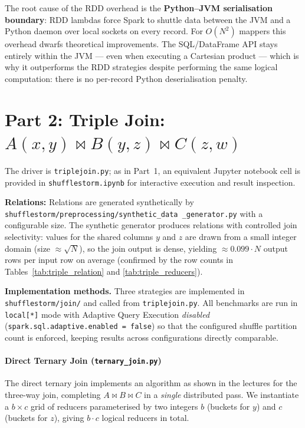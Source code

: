 \documentclass[11pt,a4paper]{article}
\begin{document}
The root cause of the RDD overhead is the \textbf{Python–JVM serialisation boundary}: RDD lambdas force Spark to shuttle data between the JVM and a Python daemon over local sockets on every record. For $O(N^2)$ mappers this overhead dwarfs theoretical improvements. The SQL/DataFrame API stays entirely within the JVM — even when executing a Cartesian product — which is why it outperforms the RDD strategies despite performing the same logical computation: there is no per-record Python deserialisation penalty.

\part*{Part 2: Triple Join: $A(x,y) \bowtie B(y,z) \bowtie C(z,w)$}

The driver is \texttt{triplejoin.py}; as in Part~1, an equivalent Jupyter notebook cell is provided in \texttt{shufflestorm.ipynb} for interactive execution and result inspection.

\textbf{Relations:} Relations are generated synthetically by \texttt{shufflestorm/preprocessing/synthetic\_data \_generator.py} with a configurable size. The synthetic generator produces relations with controlled join selectivity: values for the shared columns $y$ and $z$ are drawn from a small integer domain (size $\approx \sqrt{N}$), so the join output is dense, yielding $\approx 0.099 \cdot N$ output rows per input row on average (confirmed by the row counts in Tables~\ref{tab:triple_relation} and \ref{tab:triple_reducers}).

\textbf{Implementation methods.} Three strategies are implemented in \texttt{shufflestorm/join/} and called from \texttt{triplejoin.py}. All benchmarks are run in \texttt{local[*]} mode with Adaptive Query Execution \emph{disabled} (\texttt{spark.sql.adaptive.enabled = false}) so that the configured shuffle partition count is enforced, keeping results across configurations directly comparable.

\subsection*{Direct Ternary Join (\texttt{ternary\_join.py})}

The direct ternary join implements an algorithm as shown in the lectures for the three-way join, completing $A \bowtie B \bowtie C$ in a \emph{single} distributed pass. We instantiate a $b \times c$ grid of reducers parameterised by two integers $b$ (buckets for $y$) and $c$ (buckets for $z$), giving $b \cdot c$ logical reducers in total.
\end{document}
